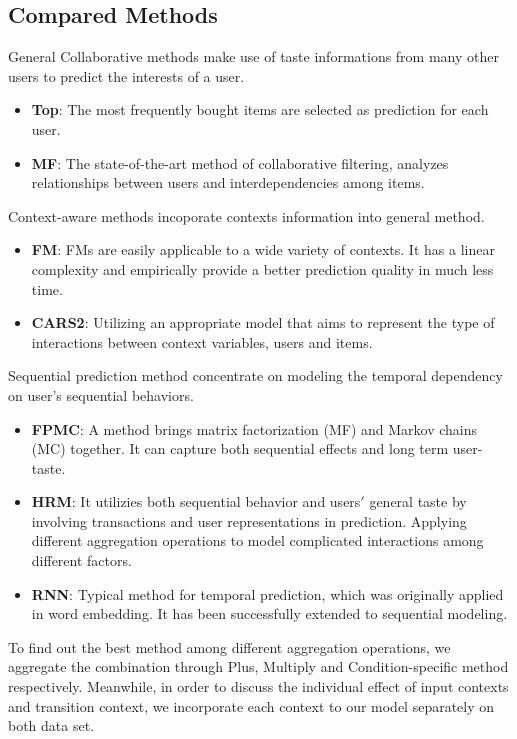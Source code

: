 \documentclass[conference]{IEEEtran}
\begin{document}
\subsection{Compared Methods}
General Collaborative methods make use of taste informations from many other users to predict the interests of a user. 
\begin{itemize}
\item \textbf{Top}: 
The most frequently bought items are selected as prediction for each user.
\item \textbf{MF}: 
The state-of-the-art method of collaborative filtering, analyzes relationships between users and interdependencies among items.
\end{itemize}

\par Context-aware methods incoporate contexts information into general method.
\begin{itemize}
\item \textbf{FM}: 
FMs are easily applicable to a wide variety of contexts. It has a linear complexity and empirically provide a better prediction quality in much less time.
\item \textbf{CARS2}: 
Utilizing an appropriate model that aims to represent the type of interactions between context variables, users and items.
\end{itemize}

\par Sequential prediction method concentrate on modeling the temporal dependency on user’s sequential behaviors.
\begin{itemize}
\item \textbf{FPMC}: 
A method brings matrix factorization (MF) and Markov chains (MC) together. It can capture
both sequential effects and long term user-taste.
\item \textbf{HRM}: 
It utilizies both sequential behavior and users$'$ general taste by involving transactions and user representations in prediction. Applying different aggregation operations to model complicated interactions among different factors.
\item \textbf{RNN}: 
Typical method for temporal prediction, which was originally applied in word embedding. It has been successfully extended to sequential modeling. 


\end{itemize}
 To find out the best method among different aggregation operations, we aggregate the combination through Plus, Multiply and Condition-specific method respectively. Meanwhile, in order to discuss the individual effect of input contexts and transition context, we incorporate each context to our model separately on both data set. 
\end{document}

